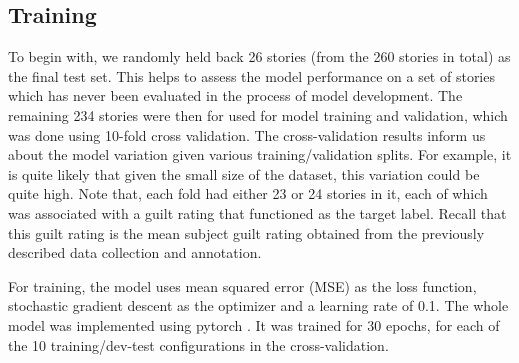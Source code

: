 \documentclass[11pt,a4paper]{article}
\begin{document}
\subsection{Training}

To begin with, we randomly held back 26 stories (from the 260 stories in total) as the final test set. This helps to assess the model performance on a set of stories which has never been evaluated in the process of model development. The remaining 234 stories were then for used for model training and validation, which was done using 10-fold cross validation. The cross-validation results inform us about the model variation given various training/validation splits. For example, it is quite likely that given the small size of the dataset, this variation could be quite high. Note that, each fold had either 23 or 24 stories in it, each of which was associated with a guilt rating that functioned as the target label. Recall that this guilt rating is the mean subject guilt rating obtained from the previously described data collection and annotation. 





For training, the model uses mean squared error (MSE) as the loss function, stochastic gradient descent as the optimizer and a learning rate of 0.1. The whole model was implemented using pytorch \citep{Paszke:2017}. It was trained for 30 epochs, for each of the 10 training/dev-test configurations in the cross-validation.
\end{document}
